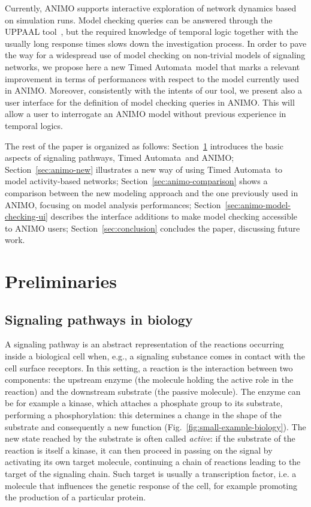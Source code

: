 \documentclass{llncs}
\newcommand{\tas}{Timed Automata}
\begin{document}
Currently, ANIMO supports interactive exploration of network dynamics based on simulation runs. 
Model checking queries can be answered through the UPPAAL tool~\cite{uppaal}, but
the required knowledge of temporal logic together with the usually long response times slows down the investigation process.
In order to pave the way for a widespread use of model checking on non-trivial models of
signaling networks, we propose here a new \tas\ model that marks a relevant improvement in terms of
performances with respect to the model currently used in ANIMO. Moreover, consistently with the intents of our tool, we
present also a user interface for the definition of model checking queries in ANIMO. This will allow a
user to interrogate an ANIMO model without previous experience in temporal logics.

The rest of the paper is organized as follows: Section~\ref{sec:basics} introduces the basic aspects
of signaling pathways, \tas\ and ANIMO; Section~\ref{sec:animo-new} illustrates a new way of using \tas\ to model
activity-based networks;
Section~\ref{sec:animo-comparison} shows a comparison between the new modeling approach and the
one previously used in ANIMO,
focusing on model analysis performances; Section~\ref{sec:animo-model-checking-ui} describes the
interface additions to make model checking accessible to ANIMO users;
Section~\ref{sec:conclusion} concludes the paper, discussing future work.

\section{Preliminaries}\label{sec:basics}

\subsection{Signaling pathways in biology}\label{sec:biologia}
A signaling pathway is an abstract representation of the reactions occurring inside a biological cell when, e.g., a
signaling substance comes in contact with the cell surface receptors.
In this setting, a reaction is the interaction between
two components: the upstream enzyme (the molecule holding the active role in the reaction) and the downstream
substrate (the passive molecule). The enzyme can be for example a kinase, which attaches a phosphate group to its
substrate, performing a phosphorylation: this determines a change in the shape of the substrate
and consequently a new function (Fig.~\ref{fig:small-example-biology}).
The new state reached by the substrate
is often called \emph{active}: if the substrate of the reaction is itself a kinase, it can then proceed in passing
on the signal by activating its own target molecule, continuing a chain of reactions leading to the target
of the signaling chain. Such target is usually a transcription factor, i.e. a molecule that influences
the genetic response of the cell, for example promoting the production of a particular protein.
\end{document}

